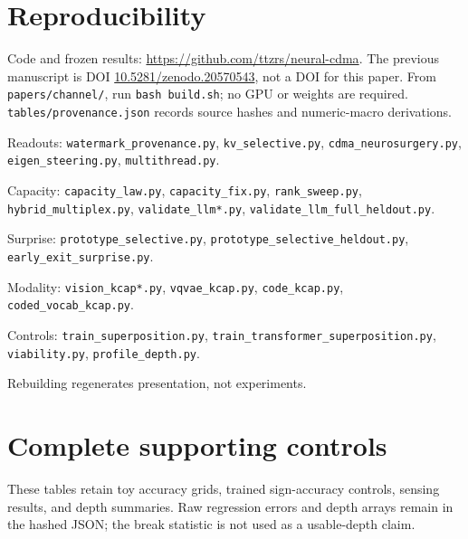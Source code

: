 \documentclass[11pt]{article}
\begin{document}
\section*{Reproducibility}
Code and frozen results: \url{https://github.com/ttzrs/neural-cdma}. The previous manuscript is DOI \href{https://doi.org/10.5281/zenodo.20570543}{10.5281/zenodo.20570543}, not a DOI for this paper. From \texttt{papers/channel/}, run \texttt{bash build.sh}; no GPU or weights are required. \texttt{tables/provenance.json} records source hashes and numeric-macro derivations.

{\footnotesize\raggedright
Readouts: \texttt{watermark\_provenance.py}, \texttt{kv\_selective.py}, \texttt{cdma\_neurosurgery.py}, \texttt{eigen\_steering.py}, \texttt{multithread.py}.\par
Capacity: \texttt{capacity\_law.py}, \texttt{capacity\_fix.py}, \texttt{rank\_sweep.py}, \texttt{hybrid\_multiplex.py}, \texttt{validate\_llm*.py}, \texttt{validate\_llm\_full\_heldout.py}.\par
Surprise: \texttt{prototype\_selective.py}, \texttt{prototype\_selective\_heldout.py}, \texttt{early\_exit\_surprise.py}.\par
Modality: \texttt{vision\_kcap*.py}, \texttt{vqvae\_kcap.py}, \texttt{code\_kcap.py}, \texttt{coded\_vocab\_kcap.py}.\par
Controls: \texttt{train\_superposition.py}, \texttt{train\_transformer\_superposition.py}, \texttt{viability.py}, \texttt{profile\_depth.py}.\par}
Rebuilding regenerates presentation, not experiments.

\FloatBarrier
\appendix
\section{Complete supporting controls}
These tables retain toy accuracy grids, trained sign-accuracy controls, sensing results, and depth summaries. Raw regression errors and depth arrays remain in the hashed JSON; the break statistic is not used as a usable-depth claim.





\FloatBarrier

{\footnotesize}
\end{document}
